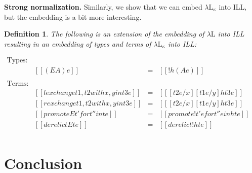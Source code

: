 \documentclass{article}
\newtheorem{definition}[theorem]{Definition}
\begin{document}
\textbf{Strong normalization.}  Similarly, we show that we can embed
$\lambda\text{L}_\kappa$ into ILL, but the embedding is a bit more
interesting.

\begin{definition}
  \label{def:embed-lambda-L!-in-ILL}
  The following is an extension of the embedding of $\lambda\text{L}$
  into ILL resulting in an embedding of types and terms of
  $\lambda\text{L}_\kappa$ into ILL:
  \begin{center}
    \begin{math}
      \begin{array}{lrllllllllllllllllll}
        \text{Types:}\\
        & [[(E A) e]] & = & [[! h(A e)]]\\        
        \\
        \text{Terms:}\\
        & [[{lexchange t1 , t2 with x , y in t3} e]] & = & [[ [t2 e/x][t1 e/y]h{t3 e}]]\\
        & [[{rexchange t1 , t2 with x , y in t3} e]] & = & [[ [t2 e/x][t1 e/y]h{t3 e}]]\\
        & [[{promoteE t' for t'' in t} e]] & = & [[promote! t' e for t'' e in h{t e}]]\\
        & [[{derelictE t} e]] & = & [[derelict! h{t e}]]\\
      \end{array}
    \end{math}
  \end{center}
\end{definition}


\section{Conclusion}







\end{document}

